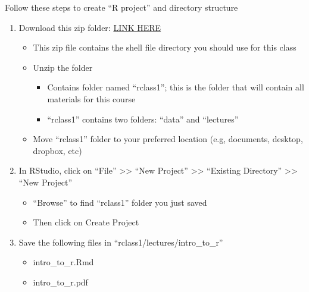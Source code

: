 \documentclass[
  8pt,
  ignorenonframetext,
  dvipsnames]{beamer}
\providecommand{\tightlist}{%
  \setlength{\itemsep}{0pt}\setlength{\parskip}{0pt}}
\let\olditem\item
\renewcommand{\item}{%
  \olditem\vspace{4pt}
}
\begin{document}
\begin{frame}{Follow these steps to create ``R project'' and directory
structure}
\protect\hypertarget{follow-these-steps-to-create-r-project-and-directory-structure}{}
\begin{enumerate}
\tightlist
\item
  Download this zip folder:
  \href{https://github.com/anyone-can-cook/rclass1/blob/master/rclass1.zip}{LINK
  HERE}

  \begin{itemize}
  \tightlist
  \item
    This zip file contains the shell file directory you should use for
    this class
  \item
    Unzip the folder

    \begin{itemize}
    \tightlist
    \item
      Contains folder named ``rclass1''; this is the folder that will
      contain all materials for this course
    \item
      ``rclass1'' contains two folders: ``data'' and ``lectures''
    \end{itemize}
  \item
    Move ``rclass1'' folder to your preferred location (e.g, documents,
    desktop, dropbox, etc)
  \end{itemize}
\item
  In RStudio, click on ``File'' \textgreater\textgreater{} ``New
  Project'' \textgreater\textgreater{} ``Existing Directory''
  \textgreater\textgreater{} ``New Project''

  \begin{itemize}
  \tightlist
  \item
    ``Browse'' to find ``rclass1'' folder you just saved
  \item
    Then click on Create Project
  \end{itemize}
\item
  Save the following files in ``rclass1/lectures/intro\_to\_r''

  \begin{itemize}
  \tightlist
  \item
    intro\_to\_r.Rmd
  \item
    intro\_to\_r.pdf
  \end{itemize}
\end{enumerate}
\end{frame}
\end{document}
